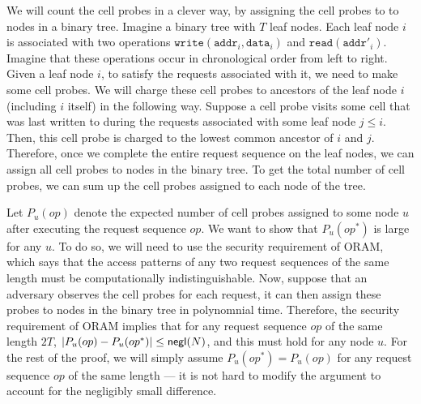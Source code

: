 We will count the cell probes in a clever way, by assigning
the cell probes to 
to nodes in a binary tree. 
Imagine a binary tree with $T$ leaf nodes.
Each leaf node $i$ is associated with two operations
$\texttt{write}(\texttt{addr}_i, \texttt{data}_i)$
and $\texttt{read}(\texttt{addr}'_i)$.
Imagine that these operations 
occur in chronological order from left to right. 
Given a leaf node $i$, 
to satisfy the requests associated with it,
we need to make some cell probes.
We will charge these cell probes 
to ancestors of the leaf node $i$ (including $i$ itself) in the following way. 
Suppose a cell probe  
visits some cell that was last  
written to during the 
requests associated with some leaf node $j \leq i$.
Then, this cell probe is charged to the 
lowest common 
ancestor of $i$ and $j$.
Therefore, once we complete the entire request sequence
on the leaf nodes, we can assign all cell probes
to nodes in the binary tree.
To get the total number of cell probes, we can sum
up the cell probes assigned to each node of the tree.


Let $P_u(op)$ denote the expected number 
of cell probes assigned to 
some node $u$ after executing the request sequence $op$.
We want to show that $P_u(op^*)$ is large for any $u$.
To do so, we will need to use the security requirement of ORAM,
 which says that the access patterns
of any two request sequences of the same length
must be computationally indistinguishable.
Now, suppose that an adversary 
observes the cell probes
for each request, it  
can then assign these probes to nodes in the binary tree 
in polynomnial time.
Therefore, 
the security requirement of ORAM implies
that for any 
request sequence $op$ of the same length $2T$,
$|P_{u}(op) - 
P_{u}(op^*)| \leq {\sf negl}(N)$,
and this must hold for any node $u$.
For the rest of the proof, we will simply assume
$P_{u}(op^*) = P_u(op)$
for any request sequence $op$
of the same length --- it is not hard to modify the argument to account
for the negligibly small difference. 


